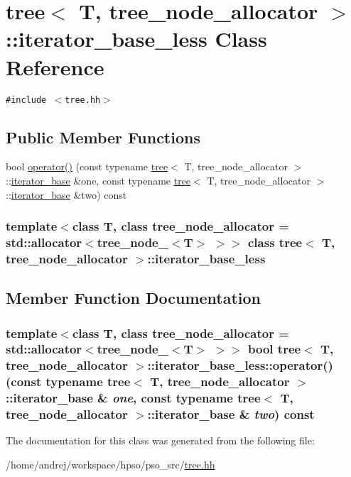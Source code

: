 \hypertarget{classtree_1_1iterator__base__less}{
\section{tree$<$ T, tree\_\-node\_\-allocator $>$::iterator\_\-base\_\-less Class Reference}
\label{classtree_1_1iterator__base__less}
}
{\tt \#include $<$tree.hh$>$}

\subsection*{Public Member Functions}
\begin{CompactItemize}
\item 
bool \hyperlink{classtree_1_1iterator__base__less_3dc4cb0c8b9a2e3ad5ed7852dd9b6a3b}{operator()} (const typename \hyperlink{classtree}{tree}$<$ T, tree\_\-node\_\-allocator $>$::\hyperlink{classtree_1_1iterator__base}{iterator\_\-base} \&one, const typename \hyperlink{classtree}{tree}$<$ T, tree\_\-node\_\-allocator $>$::\hyperlink{classtree_1_1iterator__base}{iterator\_\-base} \&two) const 
\end{CompactItemize}
\subsubsection*{template$<$class T, class tree\_\-node\_\-allocator = std::allocator$<$tree\_\-node\_\-$<$T$>$ $>$$>$ class tree$<$ T, tree\_\-node\_\-allocator $>$::iterator\_\-base\_\-less}



\subsection{Member Function Documentation}
\hypertarget{classtree_1_1iterator__base__less_3dc4cb0c8b9a2e3ad5ed7852dd9b6a3b}{
\subsubsection{\setlength{\rightskip}{0pt plus 5cm}template$<$class T, class tree\_\-node\_\-allocator = std::allocator$<$tree\_\-node\_\-$<$T$>$ $>$$>$ bool {\bf tree}$<$ T, tree\_\-node\_\-allocator $>$::iterator\_\-base\_\-less::operator() (const typename {\bf tree}$<$ T, tree\_\-node\_\-allocator $>$::{\bf iterator\_\-base} \& {\em one}, \/  const typename {\bf tree}$<$ T, tree\_\-node\_\-allocator $>$::{\bf iterator\_\-base} \& {\em two}) const}}
\label{classtree_1_1iterator__base__less_3dc4cb0c8b9a2e3ad5ed7852dd9b6a3b}




The documentation for this class was generated from the following file:\begin{CompactItemize}
\item 
/home/andrej/workspace/hpso/pso\_\-src/\hyperlink{tree_8hh}{tree.hh}\end{CompactItemize}
